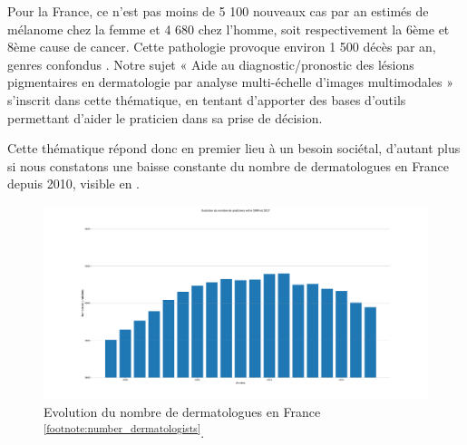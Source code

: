 Pour la France, ce n’est pas moins de 5 100 nouveaux cas par an estimés de mélanome chez la femme et 4 680 chez l’homme, soit respectivement la 6ème et 8ème cause de cancer. Cette pathologie provoque environ 1 500 décès par an, genres confondus \cite{Thuret2012}.
Notre sujet « Aide au diagnostic/pronostic des lésions pigmentaires en dermatologie par analyse multi-échelle d’images multimodales » s’inscrit dans cette thématique, en tentant d’apporter des bases d’outils permettant d’aider le praticien dans sa prise de décision.\par
Cette thématique répond donc en premier lieu à un besoin sociétal, d’autant plus si nous constatons une baisse constante du nombre de dermatologues en France depuis 2010, visible en .
\begin{figure}[H]
    \centering
    \includegraphics[width=\linewidth]{contents/x_introduction/resources/evolution_dermatologists.pdf}
    \caption{Evolution du nombre de dermatologues en France \textsuperscript{\ref{footnote:number_dermatologists}}.}
    \label{fig:number_dermatologists}
\end{figure}\par
\addtocounter{footnote}{1}

